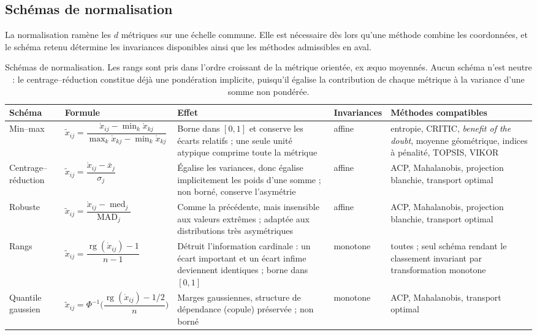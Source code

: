 \documentclass[11pt,a4paper]{article}
\theoremstyle{definition}
\theoremstyle{remark}
\newcommand{\med}{\operatorname{med}}
\newcommand{\MAD}{\operatorname{MAD}}
\newcommand{\rg}{\operatorname{rg}}
\begin{document}
\bigskip

\subsection{Schémas de normalisation}
\label{sec:normalisation}

\medskip

La normalisation ramène les $d$ métriques sur une échelle commune. Elle est nécessaire dès
lors qu'une méthode combine les coordonnées, et le schéma retenu détermine les invariances
disponibles ainsi que les méthodes admissibles en aval.

\medskip

\begin{table}[htbp]
  \centering
  \scriptsize
  \renewcommand{\arraystretch}{1.35}
  \begin{tabularx}{\textwidth}{@{}l l Y l Y@{}}
    \toprule
    \textbf{Schéma} & \textbf{Formule} & \textbf{Effet} & \textbf{Invariances} &
    \textbf{Méthodes compatibles} \\
    \midrule
    Min--max &
    $\tilde{x}_{ij} = \dfrac{\mathring{x}_{ij} - \min_k \mathring{x}_{kj}}
                            {\max_k \mathring{x}_{kj} - \min_k \mathring{x}_{kj}}$ &
    Borne dans $[0,1]$ et conserve les écarts relatifs ; une seule unité atypique comprime
    toute la métrique &
    affine &
    entropie, CRITIC, \emph{benefit of the doubt}, moyenne géométrique, indices à
    pénalité, TOPSIS, VIKOR \\
    Centrage--réduction &
    $\tilde{x}_{ij} = \dfrac{\mathring{x}_{ij} - \bar{x}_j}{\sigma_j}$ &
    Égalise les variances, donc égalise implicitement les poids d'une somme ; non borné,
    conserve l'asymétrie &
    affine &
    ACP, Mahalanobis, projection blanchie, transport optimal \\
    Robuste &
    $\tilde{x}_{ij} = \dfrac{\mathring{x}_{ij} - \med_j}{\MAD_j}$ &
    Comme la précédente, mais insensible aux valeurs extrêmes ; adaptée aux distributions
    très asymétriques &
    affine &
    ACP, Mahalanobis, projection blanchie, transport optimal \\
    Rangs &
    $\tilde{x}_{ij} = \dfrac{\rg(\mathring{x}_{ij}) - 1}{n-1}$ &
    Détruit l'information cardinale : un écart important et un écart infime deviennent
    identiques ; borne dans $[0,1]$ &
    monotone &
    toutes ; seul schéma rendant le classement invariant par transformation monotone \\
    Quantile gaussien &
    $\tilde{x}_{ij} = \Phi^{-1}\!\Big(\dfrac{\rg(\mathring{x}_{ij}) - 1/2}{n}\Big)$ &
    Marges gaussiennes, structure de dépendance (copule) préservée ; non borné &
    monotone &
    ACP, Mahalanobis, transport optimal \\
    \bottomrule
  \end{tabularx}
  \caption{Schémas de normalisation. Les rangs sont pris dans l'ordre croissant de la
  métrique orientée, ex \ae quo moyennés. Aucun schéma n'est neutre : le
  centrage--réduction constitue déjà une pondération implicite, puisqu'il égalise la
  contribution de chaque métrique à la variance d'une somme non pondérée.}
  \label{tab:normalisation}
\end{table}
\end{document}
